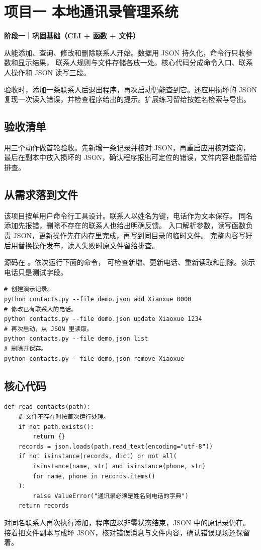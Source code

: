 \chapter*{项目一 本地通讯录管理系统}

\textbf{阶段一｜巩固基础（CLI + 函数 + 文件）}

从能添加、查询、修改和删除联系人开始。数据用 JSON 持久化，命令行只收参数和显示结果，
联系人规则与文件存储各放一处。核心代码分成命令入口、联系人操作和 JSON 读写三段。

验收时，添加一条联系人后退出程序，再次启动仍能查到它。还应用损坏的 JSON
复现一次读入错误，并检查程序给出的提示。扩展练习留给按姓名检索与导出。

\section*{验收清单}
用三个动作做首轮验收。先新增一条记录并核对 JSON，再重启应用核对查询，
最后在副本中放入损坏的 JSON，确认程序报出可定位的错误，文件内容也能留给排查。

\section*{从需求落到文件}
该项目按单用户命令行工具设计。联系人以姓名为键，电话作为文本保存。
同名添加先报错，删除不存在的联系人也给出明确反馈。
入口解析参数，读写函数负责 JSON，更新操作先在内存里完成，再写到同目录的临时文件。
完整内容写好后用替换操作发布，读入失败时原文件留给排查。

源码在 。依次运行下面的命令，
可检查新增、更新电话、重新读取和删除。演示电话只是测试字段。
\begin{lstlisting}[language={},title={\texttt{terminal}}]
# 创建演示记录。
python contacts.py --file demo.json add Xiaoxue 0000
# 修改已有联系人的电话。
python contacts.py --file demo.json update Xiaoxue 1234
# 再次启动，从 JSON 里读取。
python contacts.py --file demo.json list
# 删除并保存。
python contacts.py --file demo.json remove Xiaoxue
\end{lstlisting}
\section*{核心代码}
\begin{lstlisting}[title={\code{contacts.py 中的读取}}]
def read_contacts(path):
    # 文件不存在时按首次运行处理。
    if not path.exists():
        return {}
    records = json.loads(path.read_text(encoding="utf-8"))
    if not isinstance(records, dict) or not all(
        isinstance(name, str) and isinstance(phone, str)
        for name, phone in records.items()
    ):
        raise ValueError("通讯录必须是姓名到电话的字典")
    return records
\end{lstlisting}
对同名联系人再次执行添加，程序应以非零状态结束，JSON 中的原记录仍在。
接着把文件副本写成坏 JSON，核对错误消息与文件内容，确认错误现场还保留着。

